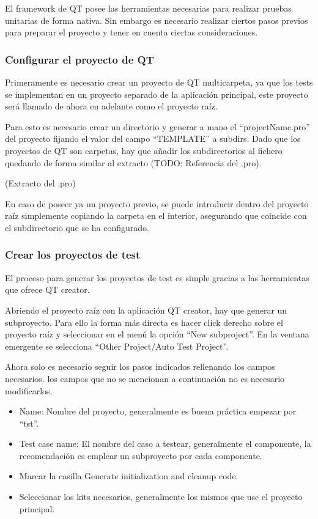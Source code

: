 El framework de QT posee las herramientas necesarias para realizar pruebas unitarias de forma nativa. Sin embargo es necesario realizar ciertos pasos previos para preparar el proyecto y tener en cuenta ciertas consideraciones.

\subsubsection{Configurar el proyecto de QT}

Primeramente es necesario crear un proyecto de QT multicarpeta, ya que los tests se implementan en un proyecto separado de la aplicación principal, este proyecto será llamado de ahora en adelante como el proyecto raíz.

Para esto es necesario crear un directorio y generar a mano el ``projectName.pro'' del proyecto fijando el valor del campo ``TEMPLATE'' a subdirs. Dado que los proyectos de QT son carpetas, hay que añadir los subdirectorios al fichero quedando de forma similar al extracto (TODO: Referencia del .pro). 

(Extracto del .pro)

En caso de poseer ya un proyecto previo, se puede introducir dentro del proyecto raíz simplemente copiando la carpeta en el interior, asegurando que coincide con el subdirectorio que se ha configurado.

\subsubsection{Crear los proyectos de test}

El proceso para generar los proyectos de test es simple gracias a las herramientas que ofrece QT creator.

Abriendo el proyecto raíz con la aplicación QT creator, hay que generar un subproyecto. Para ello la forma más directa es hacer click derecho sobre el proyecto raíz y seleccionar en el menú la opción ``New subproject''. En la ventana emergente se selecciona ``Other Project/Auto Test Project''.

Ahora solo es necesario seguir los pasos indicados rellenando los campos necesarios. los campos que no se mencionan a continuación no es necesario modificarlos.

\begin{itemize}
    \item Name: Nombre del proyecto, generalmente es buena práctica empezar por ``tst''.
    \item Test case name: El nombre del caso a testear, generalmente el componente, la recomendación es emplear un subproyecto por cada componente.
    \item Marcar la casilla Generate initialization and cleanup code.
    \item Seleccionar los kits necesarios, generalmente los mismos que use el proyecto principal.
\end{itemize}

